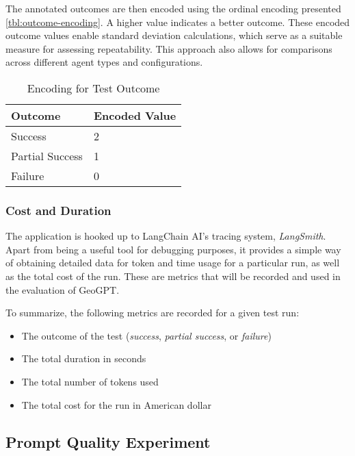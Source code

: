 The annotated outcomes are then encoded using the ordinal encoding presented \autoref{tbl:outcome-encoding}. A higher value indicates a better outcome. These encoded outcome values enable standard deviation calculations, which serve as a suitable measure for assessing repeatability. This approach also allows for comparisons across different agent types and configurations.

\begin{table}[htbp]
    \centering
    \caption{Encoding for Test Outcome}
    \label{tbl:outcome-encoding}
    \begin{tabularx}{0.5\textwidth}{XX}
        \toprule
        \textbf{Outcome} & \textbf{Encoded Value} \\
        \midrule
        Success          & 2                      \\
        Partial Success  & 1                      \\
        Failure          & 0                      \\
        \bottomrule
    \end{tabularx}
\end{table}


\subsubsection{Cost and Duration}

The application is hooked up to LangChain AI's tracing system, \textit{LangSmith}. Apart from being a useful tool for debugging purposes, it provides a simple way of obtaining detailed data for token and time usage for a particular run, as well as the total cost of the run. These are metrics that will be recorded and used in the evaluation of GeoGPT.

To summarize, the following metrics are recorded for a given test run:

\begin{itemize}
    \item The outcome of the test (\textit{success}, \textit{partial success}, or \textit{failure})
    \item The total duration in seconds
    \item The total number of tokens used
    \item The total cost for the run in American dollar
\end{itemize}


\subsection{Prompt Quality Experiment}
\label{subsec:prompt-quality-test-setup}

